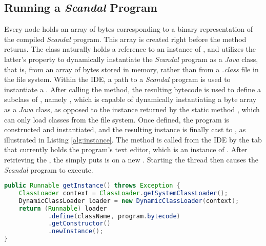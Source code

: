 \subsection{Running a \emph{Scandal} Program}

Every  node holds an array of bytes corresponding to a binary representation of the compiled \emph{Scandal} program. This array is created right before the  method returns. The  class naturally holds a reference to an instance of , and utilizes the latter's  property to dynamically instantiate the \emph{Scandal} program as a \emph{Java} class, that is, from an array of bytes stored in memory, rather than from a \emph{.class} file in the file system. Within the IDE, a path to a \emph{Scandal} program is used to instantiate a . After calling the  method, the resulting bytecode is used to define a subclass of , namely , which is capable of dynamically instantiating a byte array as a \emph{Java} class, as opposed to the instance returned by the static method , which can only load classes from the file system. Once defined, the program is constructed and instantiated, and the resulting instance is finally cast to , as illustrated in Listing \ref{alg:instance}. The  method is called from the IDE by the tab that currently holds the program's text editor, which is an instance of . After retrieving the , the  simply puts is on a new . Starting the thread then causes the \emph{Scandal} program to execute.

\begin{lstlisting}[language=Java,caption={Obtaining an instance of a \emph{Scandal} program.},label={alg:instance}]
public Runnable getInstance() throws Exception {
	ClassLoader context = ClassLoader.getSystemClassLoader();
	DynamicClassLoader loader = new DynamicClassLoader(context);
	return (Runnable) loader
			.define(className, program.bytecode)
			.getConstructor()
			.newInstance();
}
\end{lstlisting}
